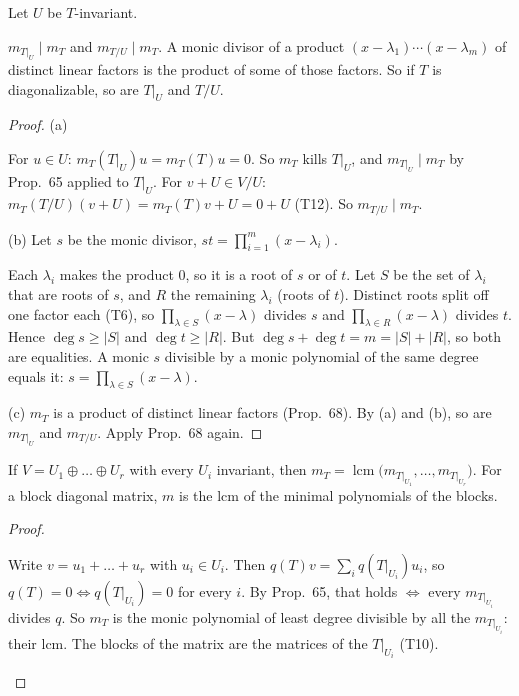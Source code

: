 \documentclass[10pt]{scrartcl}
\newenvironment{steps}{\begin{enumerate}[label=\arabic*.,leftmargin=1.5em,itemsep=2pt,topsep=2pt]}{\end{enumerate}}
\begin{document}
\begin{proposition*}
  Let $U$ be $T$-invariant.
  \begin{enumerate}[(a)]
    \ii $m_{T|_U}\mid m_T$ and $m_{T/U}\mid m_T$.
    \ii A monic divisor of a product $(x-\lambda_1)\cdots(x-\lambda_m)$ of distinct linear factors is the product of some of those factors.
    \ii So if $T$ is diagonalizable, so are $T|_U$ and $T/U$.
  \end{enumerate}
\end{proposition*}
\begin{proof}
  (a)
  \begin{steps}
    \ii For $u\in U$: $m_T(T|_U)u=m_T(T)u=0$. So $m_T$ kills $T|_U$, and $m_{T|_U}\mid m_T$ by Prop.~65 applied to $T|_U$.
    \ii For $v+U\in V/U$: $m_T(T/U)(v+U)=m_T(T)v+U=0+U$ (T12). So $m_{T/U}\mid m_T$.
  \end{steps}
  (b) Let $s$ be the monic divisor, $st=\prod_{i=1}^m(x-\lambda_i)$.
  \begin{steps}
    \ii Each $\lambda_i$ makes the product $0$, so it is a root of $s$ or of $t$. Let $S$ be the set of $\lambda_i$ that are roots of $s$, and $R$ the remaining $\lambda_i$ (roots of $t$).
    \ii Distinct roots split off one factor each (T6), so $\prod_{\lambda\in S}(x-\lambda)$ divides $s$ and $\prod_{\lambda\in R}(x-\lambda)$ divides $t$. Hence $\deg s\ge|S|$ and $\deg t\ge|R|$.
    \ii But $\deg s+\deg t=m=|S|+|R|$, so both are equalities. A monic $s$ divisible by a monic polynomial of the same degree equals it: $s=\prod_{\lambda\in S}(x-\lambda)$.
  \end{steps}
  (c) $m_T$ is a product of distinct linear factors (Prop.~68). By (a) and (b), so are $m_{T|_U}$ and $m_{T/U}$. Apply Prop.~68 again.
\end{proof}

\begin{proposition*}
  If $V=U_1\oplus\dots\oplus U_r$ with every $U_i$ invariant, then $m_T=\operatorname{lcm}\bigl(m_{T|_{U_1}},\dots,m_{T|_{U_r}}\bigr)$. For a block diagonal matrix, $m$ is the lcm of the minimal polynomials of the blocks.
\end{proposition*}
\begin{proof}
  \begin{steps}
    \ii Write $v=u_1+\dots+u_r$ with $u_i\in U_i$. Then $q(T)v=\sum_iq(T|_{U_i})u_i$, so $q(T)=0\iff q(T|_{U_i})=0$ for every $i$.
    \ii By Prop.~65, that holds $\iff$ every $m_{T|_{U_i}}$ divides $q$.
    \ii So $m_T$ is the monic polynomial of least degree divisible by all the $m_{T|_{U_i}}$: their lcm. The blocks of the matrix are the matrices of the $T|_{U_i}$ (T10).
  \end{steps}
\end{proof}
\end{document}

